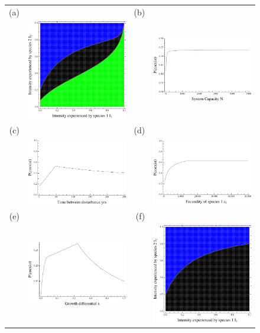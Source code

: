 \documentclass[preprint,10pt,reqno]{report}
\begin{document}
\begin{figure}[htbp]
\centering
\begin{tabular}{rrrr}
(a)&&(b)&\\
&\includegraphics[width=2in]{fullexample.pdf}&&\includegraphics[width=2in]{fullintwithN.pdf} \\
(c)&&(d)&\\
&\includegraphics[width=2in]{fullintwTd.pdf}&&\includegraphics[width=2in]{fullintwiths1.pdf} \\
(e)&&(f)&\\
&\includegraphics[width=2in]{fulltointwx.pdf}&&\includegraphics[width=2in]{fulllarges1.pdf}

\end{tabular}
\end{figure}
\end{document}
